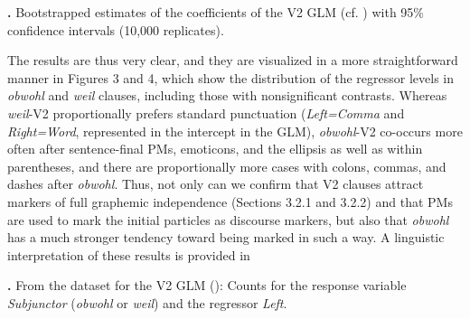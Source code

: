 \begin{styleMoutonCaption}
\textbf{.} Bootstrapped estimates of the coefficients of the V2 GLM (cf. ) with 95\% confidence intervals (10,000 replicates).
\end{styleMoutonCaption}

\begin{styleMoutonTextAfterTableFigure}
The results are thus very clear, and they are visualized in a more straightforward manner in Figures 3 and 4, which show the distribution of the regressor levels in \textit{obwohl} and \textit{weil} clauses, including those with nonsignificant contrasts. Whereas \textit{weil}{}-V2 proportionally prefers standard punctuation (\textit{Left=Comma} and \textit{Right=Word}, represented in the intercept in the GLM), \textit{obwohl}{}-V2 co-occurs more often after sentence-final PMs, emoticons, and the ellipsis as well as within parentheses, and there are proportionally more cases with colons, commas, and dashes after \textit{obwohl}. Thus, not only can we confirm that V2 clauses attract markers of full graphemic independence (Sections 3.2.1 and 3.2.2) and that PMs are used to mark the initial particles as discourse markers, but also that \textit{obwohl} has a much stronger tendency toward being marked in such a way. A linguistic interpretation of these results is provided in 
\end{styleMoutonTextAfterTableFigure}

\begin{styleMoutonCaption}
  
 
\end{styleMoutonCaption}

\begin{styleMoutonCaption}
\textbf{.} From the dataset for the V2 GLM (): Counts for the response vari\-able \textit{Sub\-junctor} (\textit{obwohl} or \textit{weil}) and the regressor \textit{Left}.
\end{styleMoutonCaption}

\begin{styleMoutonCaption}
  
 
\end{styleMoutonCaption}

